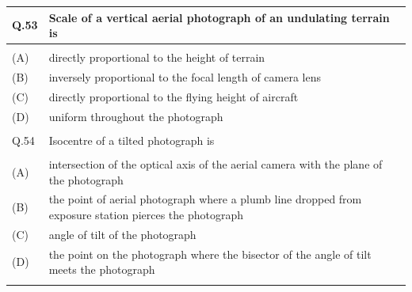 \documentclass[12pt]{article}
\begin{document}
\begin{table}[H]
\renewcommand{\arraystretch}{3}
\setlength{\tabcolsep}{8pt}
\begin{tabular}{|l|p{15cm}|}
\hline
 
Q.53& Scale of a vertical aerial photograph of an undulating terrain is\\ \hline 
 & \\ \hline
(A)&directly proportional to the height of terrain\\ \hline
(B)&inversely proportional to the focal length of camera lens\\ \hline
(C)&directly proportional to the flying height of aircraft\\ \hline
(D)&uniform throughout the photograph\\ \hline
 & \\ \hline

Q.54 &Isocentre of a tilted photograph is\\ \hline
 & \\ \hline
(A)&intersection of the optical axis of the aerial camera with the plane of the photograph\\ \hline
(B)&the point of aerial photograph where a plumb line dropped from exposure station
pierces the photograph\\ \hline
(C)&angle of tilt of the photograph\\ \hline
(D)&the point on the photograph where the bisector of the angle of tilt meets the
photograph\\ \hline
& \\ \hline

\end{tabular}
\end{table}
\end{document}
